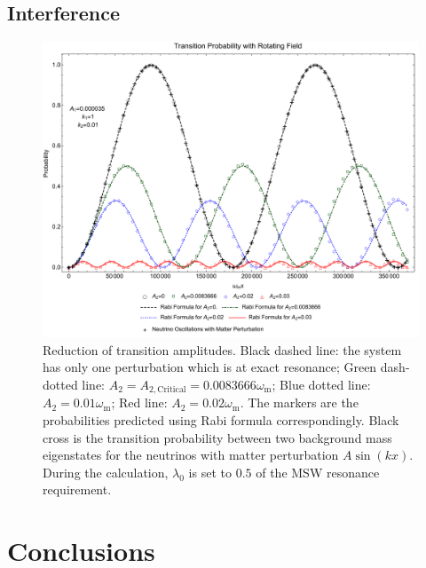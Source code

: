 \documentclass[%
preprint,
 amsmath,amssymb,
 aps,
]{revtex4-1}
\begin{document}
\subsection{Interference}

\begin{figure}[!htbp]
                \centering
                \includegraphics[width=\textwidth]{assets/rabi-oscillations-energy-gap-change-k2-0-01}
                \caption{Reduction of transition amplitudes. Black dashed line: the system has only one perturbation which is at exact resonance; Green dash-dotted line: $A_2=A_{2,\mathrm{Critical}}=0.0083666\omega_{\mathrm m}$; Blue dotted line: $A_2=0.01\omega_{\mathrm m}$; Red line: $A_2=0.02\omega_{\mathrm m}$. The markers are the probabilities predicted using Rabi formula correspondingly. Black cross is the transition probability between two background mass eigenstates for the neutrinos with matter perturbation $A\sin(kx)$. During the calculation, $\lambda_0$ is set to $0.5$ of the MSW resonance requirement.}
                \label{fig-rabi-oscillations-energy-gap-change}
\end{figure}



\section{\label{conclusions}Conclusions}









 



\end{document}
